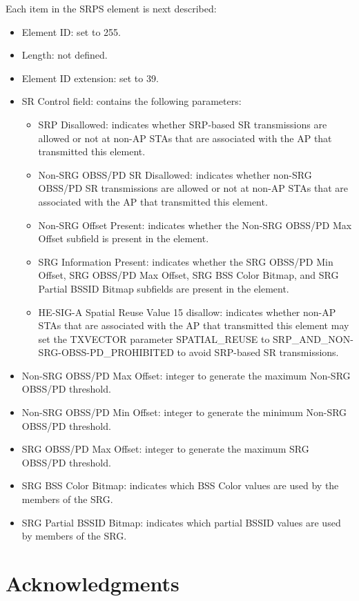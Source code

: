 \documentclass[comsoc]{IEEEtran}
\begin{document}
	Each item in the SRPS element is next described:
	\begin{itemize}
		\item Element ID: set to 255.
		\item Length: not defined.
		\item Element ID extension: set to 39.
		\item SR Control field: contains the following parameters:
		\begin{itemize}
			\item SRP Disallowed: indicates whether SRP-based SR transmissions are allowed or not at non-AP STAs that are associated with the AP that transmitted this element.
			\item Non-SRG OBSS/PD SR Disallowed: indicates whether non-SRG OBSS/PD SR transmissions are allowed or not at non-AP STAs that are associated with the AP that transmitted this element.
			\item Non-SRG Offset Present: indicates whether the Non-SRG OBSS/PD Max Offset subfield is present in the element.
			\item SRG Information Present: indicates whether the SRG OBSS/PD Min Offset, SRG OBSS/PD Max Offset, SRG BSS Color Bitmap, and SRG Partial BSSID Bitmap subfields are present in the element.
			\item HE-SIG-A Spatial Reuse Value 15 disallow: indicates whether non-AP STAs that are associated with the AP that transmitted this element may set the TXVECTOR parameter SPATIAL\_REUSE to SRP\_AND\_NON-SRG-OBSS-PD\_PROHIBITED to avoid SRP-based SR transmissions.
		\end{itemize}
		\item Non-SRG OBSS/PD Max Offset: integer to generate the maximum Non-SRG OBSS/PD threshold.
		\item Non-SRG OBSS/PD Min Offset: integer to generate the minimum Non-SRG OBSS/PD threshold.
		\item SRG OBSS/PD Max Offset: integer to generate the maximum SRG OBSS/PD threshold.
		\item SRG BSS Color Bitmap: indicates which BSS Color values are used by the members of the SRG.
		\item SRG Partial BSSID Bitmap: indicates which partial BSSID values are used by members of the SRG.
	\end{itemize}
	
	\section*{Acknowledgments}
	
\end{document}
